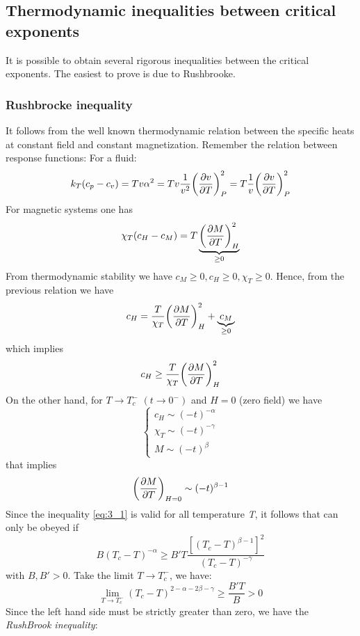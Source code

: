 \documentclass[../../Main/Main.tex]{subfiles}
\begin{document}
\subsection{Thermodynamic inequalities between critical exponents}
\label{sec:3_2}
It is possible to obtain several rigorous inequalities between the critical exponents. The easiest to prove is due to Rushbrooke.
\subsubsection{Rushbrocke inequality}
It follows from the well known thermodynamic relation between the specific heats at constant field and constant magnetization.
Remember the relation between response functions:
For a fluid:
\begin{equation*}
   k_T (c_p-c_v)=T v \alpha ^2 = T v \frac{1}{v^2} \qty(\pdv{v}{T} )^2_P = T \frac{1}{v} \qty(\pdv{v}{T} )^2_P
\end{equation*}
For magnetic systems one has
\begin{equation*}
  \chi _T (c_H-c_M) = T \underbrace{ \qty(\pdv{M}{T} )^2_H }_{\geq 0}
\end{equation*}
From thermodynamic stability we have \( c_M \geq 0, c_H \geq 0, \chi _T \geq 0  \).
Hence, from the previous relation we have
\begin{equation*}
   c_H = \frac{T}{\chi _T} \qty(\pdv{M}{T} )^2_H + \underbrace{c_M}_{\ge0}
\end{equation*}
which implies
\begin{equation}
   c_H \ge \frac{T}{\chi _T} \qty(\pdv{M}{T} )^2_H 
   \label{eq:3_1}
\end{equation}
On the other hand, for \( T \rightarrow T_c^- \) \( (t \rightarrow 0^-) \) and \( H=0 \) (zero field) we have
\begin{equation*}
  \begin{cases}
   c_H \sim (-t)^{-\alpha }\\
   \chi _T \sim (-t)^{-\gamma  } \\
    M \sim (-t)^{\beta }
  \end{cases}
\end{equation*}
that implies
\begin{equation*}
 \qty( \pdv{M}{T})_{H=0} \sim (-t)^{\beta -1}    
\end{equation*}
Since the inequality \eqref{eq:3_1} is valid for all temperature \emph{T}, it follows that can only be obeyed if
\begin{equation*}
  B (T_c - T)^{-\alpha } \ge B' T \frac{[(T_c - T)^{\beta -1}]^2}{(T_c-T)^{-\gamma  }}
\end{equation*}
with \( B,B' > 0 \). Take the limit \( T \rightarrow T_c^- \), we have:
\begin{equation*}
  \lim_{T \rightarrow T_c^-} (T_c - T)^{2- \alpha - 2 \beta - \gamma  } \ge \frac{B' T}{B} > 0
\end{equation*}
Since the left hand side must be strictly greater than zero, we have the \textit{RushBrook inequality}:
\end{document}
